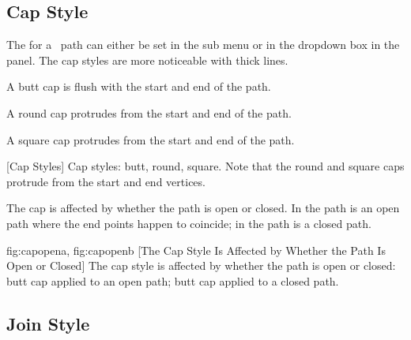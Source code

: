 \subsection{Cap Style}\label{sec:capstyle}


The  for a \selected\
path can either be set in the  sub
menu or in the \inlineglsdef{linestyle.cap} dropdown box in the
 panel. The cap styles are more noticeable
with thick lines.


A butt cap is flush with the start and end of the \gls{path}.


A round cap protrudes from the start and end of the \gls{path}.


A square cap protrudes from the start and end of the \gls{path}.

{}
[Cap Styles]
{Cap styles:  butt,  round,
 square.  Note that the round and square caps protrude from
the start and end vertices.}

\begin{information}
The cap is affected by whether the \gls{path} is open or closed. In
\figureref{fig:capopena} the path is an open path where the end
points happen to coincide; in  the path is a
closed path.
\end{information}

{
 {fig:capopena}{}{},
 {fig:capopenb}{}{}
}
[The Cap Style Is Affected by Whether the Path Is Open or Closed]
{The cap style is affected by whether the path is open or
closed:
 butt cap applied to an open path;
 butt cap applied to a closed path.}


\subsection{Join Style}\label{sec:joinstyle}


